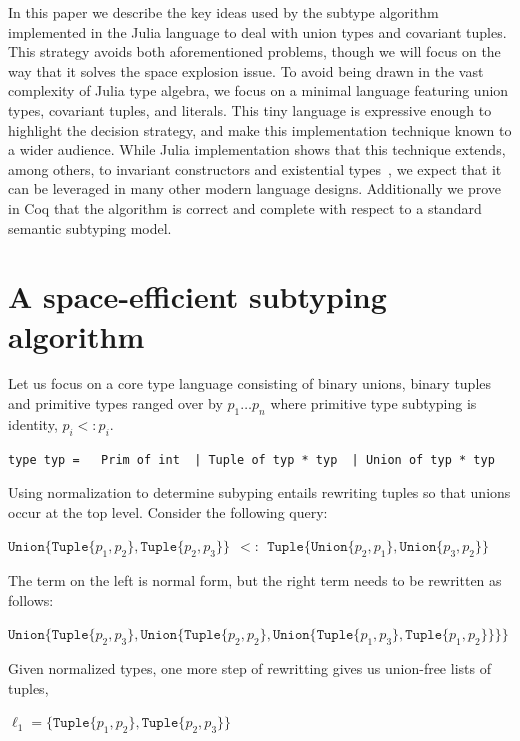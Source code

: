 \documentclass[a4paper,english]{lipics-v2019}
\newcommand{\xt}[1]{\texttt{#1}}
\newcommand{\union}[2]{\xt{Union\{}#1,#2\xt{\}}}
\newcommand{\tuple}[1]{\xt{Tuple\{}#1\xt{\}}}
\begin{document}
In this paper we describe the key ideas used by the subtype algorithm
implemented in the Julia language to deal with union types and covariant
tuples. This strategy avoids both aforementioned problems, though we will
focus  on the way that it solves the space explosion issue. To avoid being
drawn in the vast complexity of Julia type algebra, we focus on a minimal
language featuring union types, covariant tuples, and literals. This tiny
language is expressive enough to highlight the decision strategy, and make
this implementation technique known to a wider audience.  While Julia
implementation shows that this technique extends, among others, to invariant
constructors and existential types~\cite{DBLP:NardelliBPCBV18}, we expect that
it can be leveraged in many other modern language designs. Additionally we
prove in Coq that the algorithm is correct and complete with respect to a
standard semantic subtyping model.

\newpage

\section{A space-efficient subtyping algorithm}

Let us focus on a core type language consisting of binary unions, binary
tuples and primitive types ranged over by $p_1 \dots p_n$ where primitive
type subtyping is identity, $p_i <: p_i$.

\medskip
\begin{lstlisting}
type typ =   Prim of int  | Tuple of typ * typ  | Union of typ * typ
\end{lstlisting}
\medskip

\noindent
Using normalization to determine subyping entails rewriting tuples so that
unions occur at the top level. Consider the following query:

\medskip
$\union{ \tuple{p_1,p_2}}{\tuple{p_2,p_3}} ~~ <:~~  \tuple{ \union{p_2}{p_1}, \union{p_3}{p_2}}$
\medskip

\noindent
The term on the left is normal form, but the right term  needs to be
rewritten as follows:

\medskip
$\union{ \tuple{p_2,p_3}}
  {\union{ \tuple{p_2,p_2}}
    {\union{ \tuple{p_1,p_3}}
           {\tuple{p_1,p_2}}}}$
\medskip

\noindent
Given normalized types, one more step of rewritting gives us union-free
lists of tuples,

\medskip
$\ell_1 = \{  \tuple{p_1,p_2}, \tuple{p_2,p_3}  \}$
\medskip
\end{document}
